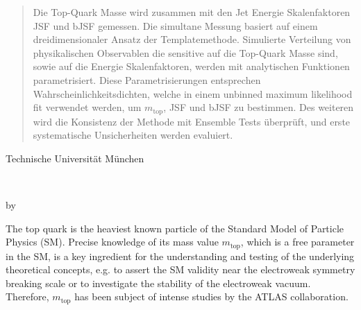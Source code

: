 \begin{abstract*}
\begin{abstract}
Die Top-Quark Masse wird zusammen mit den Jet Energie Skalenfaktoren JSF und bJSF gemessen. Die simultane Messung basiert auf einem  dreidimensionaler Ansatz  der Templatemethode. Simulierte Verteilung von physikalischen Observablen die sensitive auf die Top-Quark Masse sind, sowie auf die Energie  Skalenfaktoren, werden mit analytischen Funktionen parametrisiert. Diese Parametrisierungen entsprechen Wahrscheinlichkeitsdichten, welche in einem unbinned maximum likelihood fit verwendet werden, um $m_{\textrm{top}}$, JSF und bJSF zu bestimmen. Des weiteren wird die Konsistenz der Methode mit Ensemble Tests überprüft, und erste systematische Unsicherheiten werden evaluiert.
 \end{abstract}
\cleardoublepage


\vspace*{0.15\textheight}
\begin{abstract*}
	{ \centering
		{\fontsize{30}{35}\selectfont
	
			Technische Universität München}
		
		\vspace{0.2cm}
		
		\begin{singlespace}
		\Huge
			\InstituteName	
		\end{singlespace}
		\begin{singlespace}
		\fontsize{15}{10}\selectfont
	
			\Institute	
		\end{singlespace}
		\vspace{2.0cm}
		\begin{singlespace}
			{\Large
				\textbf{\thesistitle} \\
			}
		\end{singlespace}
		\vspace{0.5cm}
		\begin{singlespace}
			
			by\\
			\vspace{0.5cm}
			\thesisauthor
		\end{singlespace}
		\date{}
		
		\vspace{2.0cm}
	}
\begin{abstract*}
\noindent The top quark is the heaviest known particle of the Standard Model of Particle Physics (SM). Precise knowledge of its mass value $m_{\textrm{top}}$, which is a free parameter in the SM, is a key ingredient for the understanding and testing of the underlying theoretical concepts, e.g. to assert the SM validity near the electroweak symmetry breaking scale or to investigate the stability of the electroweak vacuum. Therefore, $m_{\textrm{top}}$ has been subject of intense studies by the ATLAS collaboration.


\end{abstract*}
\end{abstract*}
\end{abstract*}
